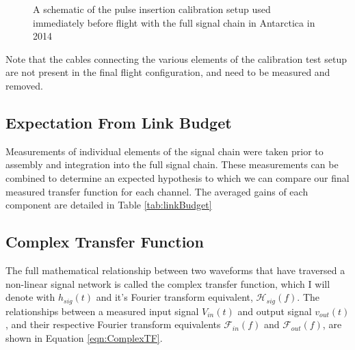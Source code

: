 \begin{figure}
	\caption{A schematic of the pulse insertion calibration setup used immediately before flight with the full signal chain in Antarctica in 2014}
	\label{fig:sigChainSetup}
\end{figure}
			
	Note that the cables connecting the various elements of the calibration test setup are not present in the final flight configuration, and need to be measured and removed.
			

	\subsection{Expectation From Link Budget}
		Measurements of individual elements of the signal chain were taken prior to assembly and integration into the full signal chain.  These measurements can be combined to determine an expected hypothesis to which we can compare our final measured transfer function for each channel.  The averaged gains of each component are detailed in Table \ref{tab:linkBudget}
		
	\begin{figure}
		\begin{tabular}
	
		\end{tabular}
	\end{figure}

		
	\subsection{Complex Transfer Function}
		The full mathematical relationship between two waveforms that have traversed a non-linear signal network is called the complex transfer function, which I will denote with $h_{sig}(t)$ and it's Fourier transform equivalent, $\mathcal{H}_{sig}(f)$.  The relationships between a measured input signal $V_{in}(t)$ and output signal $v_{out}(t)$, and their respective Fourier transform equivalents $\mathcal{F}_{in}(f)$ and $\mathcal{F}_{out}(f)$, are shown in Equation \ref{eqn:ComplexTF}.
	
